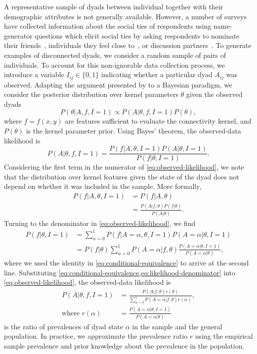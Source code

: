 \documentclass{scrartcl}
\newcommand{\observed}[1]{#1}
\begin{document}
A representative sample of dyads between individual together with their demographic attributes is not generally available. However, a number of surveys have collected information about the social ties of respondents using name-generator questions which elicit social ties by asking respondents to nominate their friends~\cite{Kalmijn2007}, individuals they feel close to~\cite{Hipp2009}, or discussion partners~\cite{Marsden1987,McPherson2006}. To generate examples of disconnected dyads, we consider a random sample of pairs of individuals. To account for this non-ignorable data collection process, we introduce a variable $I_{ij}\in\{0,1\}$ indicating whether a particular dyad $A_{ij}$ was observed. Adapting the argument presented by \textcite{King2001} to a Bayesian paradigm, we consider the posterior distribution over kernel parameters $\theta$ given the observed dyads
\[
    P(\theta|\observed{A}, \observed{f}, I=1)\propto P(\observed{A}|\theta,\observed{f},I=1)P(\theta),
\]
where $f=f(x,y)$ are features sufficient to evaluate the connectivity kernel,
and $P(\theta)$ is the kernel parameter prior. Using Bayes' theorem, the observed-data likelihood is
\begin{equation}
    P(\observed{A}|\theta,\observed{f},I=1)=\frac{P(\observed{f}|\observed{A},\theta,I=1)P(\observed{A}|\theta,I=1)}{P(\observed{f}|\theta,I=1)}.\label{eq:observed-likelihood}
\end{equation}
Considering the first term in the numerator of \cref{eq:observed-likelihood}, we note that the distribution over kernel features given the state of the dyad does not depend on whether it was included in the sample. More formally,
\begin{align}
    P(f|A,\theta,I=1)&=P(f|A,\theta)\\
    &=\frac{P(A|f,\theta)P(f|\theta)}{P(A|\theta)}.\label{eq:conditional-equivalence}
\end{align}
Turning to the denominator in \cref{eq:observed-likelihood}, we find
\begin{align}
    P(f|\theta,I=1)&=\sum_{\alpha=0}^1 P(f|A=\alpha,\theta,I=1)P(A=\alpha|\theta,I=1)\nonumber\\
    &=P(f|\theta)\sum_{\alpha=0}^1 P(A=\alpha|f,\theta)\frac{P(A=\alpha|\theta,I=1)}{P(A=\alpha|\theta)},\label{eq:likelihood-denominator}
\end{align}
where we used the identity in \cref{eq:conditional-equivalence} to arrive at the second line. Substituting \cref{eq:conditional-equivalence,eq:likelihood-denominator} into \cref{eq:observed-likelihood}, the observed-data likelihood is
\begin{align}
    P(A|\theta,f,I=1)&=\frac{P(A|f,\theta)r(\theta)}{\sum_{\alpha=0}^1 P(A=\alpha|f,\theta)r(\alpha)},\label{eq:observed-likelihood-final}\\
    \text{where }r(\alpha)&=\frac{P(A=\alpha|\theta,I=1)}{P(A=\alpha|\theta)}\nonumber
\end{align}
is the ratio of prevalences of dyad state $\alpha$ in the sample and the general population. In practice, we approximate the prevalence ratio $r$ using the empirical sample prevalence and prior knowledge about the prevalence in the population.
\end{document}
